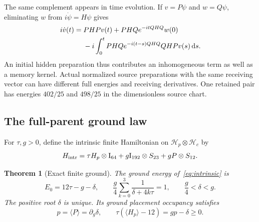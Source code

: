 \documentclass[11pt]{article}
\newtheorem{theorem}{Theorem}[section]
\theoremstyle{definition}
\newcommand{\HH}{\mathcal H}
\newcommand{\Id}{\mathrm I}
\newcommand{\dd}{\mathrm d}
\begin{document}
The same complement appears in time evolution. If $v=P\psi$ and $w=Q\psi$, eliminating $w$ from $i\dot\psi=H\psi$ gives
\begin{align}\label{eq:memory}
 i\dot v(t)={}&PHPv(t)+PHQe^{-itQHQ}w(0)\notag\\
 &-i\int_0^t PHQe^{-i(t-s)QHQ}QHPv(s)\,\dd s.
\end{align}
An initial hidden preparation thus contributes an inhomogeneous term as well as a memory kernel. Actual normalized source preparations with the same receiving vector can have different full energies and receiving derivatives. One retained pair has energies $402/25$ and $498/25$ in the dimensionless source chart.

\subsection{The full-parent ground law}

For $\tau,g>0$, define the intrinsic finite Hamiltonian on $\HH_p\otimes\HH_c$ by
\begin{equation}\label{eq:intrinsic}
 H_{\rm intr}=\tau H_p\otimes\Id_{64}
       +g\Id_{192}\otimes S_{23}+gP\otimes S_{12}.
\end{equation}

\begin{theorem}[Exact finite ground]\label{thm:ground}
The ground energy of~\eqref{eq:intrinsic} is
\begin{equation}\label{eq:ground}
 E_0=12\tau-g-\delta,
 \qquad \frac g4\sum_{k=0}^3\frac1{\delta+4k\tau}=1,
 \qquad \frac g4<\delta<g.
\end{equation}
The positive root $\delta$ is unique. Its ground placement occupancy satisfies
\begin{equation}\label{eq:formation}
 p=\langle P\rangle=\partial_g\delta,
 \qquad \tau(\langle H_p\rangle-12)=gp-\delta\geq0.
\end{equation}
\end{theorem}
\end{document}
